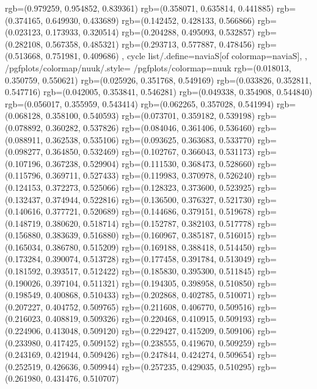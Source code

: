 {{{					rgb=(0.979259, 0.954852, 0.839361)
					rgb=(0.358071, 0.635814, 0.441885)
					rgb=(0.374165, 0.649930, 0.433689)
					rgb=(0.142452, 0.428133, 0.566866)
					rgb=(0.023123, 0.173933, 0.320514)
					rgb=(0.204288, 0.495093, 0.532857)
					rgb=(0.282108, 0.567358, 0.485321)
					rgb=(0.293713, 0.577887, 0.478456)
					rgb=(0.513668, 0.751981, 0.409686)
			},
		cycle list/.define={naviaS}{[of colormap=naviaS]},
		},
		/pgfplots/colormap/nuuk/.style={
			/pgfplots/colormap={nuuk}{%
					rgb=(0.018013, 0.350759, 0.550621)
					rgb=(0.025926, 0.351768, 0.549169)
					rgb=(0.033826, 0.352811, 0.547716)
					rgb=(0.042005, 0.353841, 0.546281)
					rgb=(0.049338, 0.354908, 0.544840)
					rgb=(0.056017, 0.355959, 0.543414)
					rgb=(0.062265, 0.357028, 0.541994)
					rgb=(0.068128, 0.358100, 0.540593)
					rgb=(0.073701, 0.359182, 0.539198)
					rgb=(0.078892, 0.360282, 0.537826)
					rgb=(0.084046, 0.361406, 0.536460)
					rgb=(0.088911, 0.362538, 0.535106)
					rgb=(0.093625, 0.363683, 0.533770)
					rgb=(0.098277, 0.364850, 0.532469)
					rgb=(0.102767, 0.366043, 0.531173)
					rgb=(0.107196, 0.367238, 0.529904)
					rgb=(0.111530, 0.368473, 0.528660)
					rgb=(0.115796, 0.369711, 0.527433)
					rgb=(0.119983, 0.370978, 0.526240)
					rgb=(0.124153, 0.372273, 0.525066)
					rgb=(0.128323, 0.373600, 0.523925)
					rgb=(0.132437, 0.374944, 0.522816)
					rgb=(0.136500, 0.376327, 0.521730)
					rgb=(0.140616, 0.377721, 0.520689)
					rgb=(0.144686, 0.379151, 0.519678)
					rgb=(0.148719, 0.380620, 0.518714)
					rgb=(0.152787, 0.382103, 0.517778)
					rgb=(0.156880, 0.383639, 0.516880)
					rgb=(0.160967, 0.385187, 0.516015)
					rgb=(0.165034, 0.386780, 0.515209)
					rgb=(0.169188, 0.388418, 0.514450)
					rgb=(0.173284, 0.390074, 0.513728)
					rgb=(0.177458, 0.391784, 0.513049)
					rgb=(0.181592, 0.393517, 0.512422)
					rgb=(0.185830, 0.395300, 0.511845)
					rgb=(0.190026, 0.397104, 0.511321)
					rgb=(0.194305, 0.398958, 0.510850)
					rgb=(0.198549, 0.400868, 0.510433)
					rgb=(0.202868, 0.402785, 0.510071)
					rgb=(0.207227, 0.404752, 0.509765)
					rgb=(0.211608, 0.406770, 0.509516)
					rgb=(0.216023, 0.408819, 0.509326)
					rgb=(0.220468, 0.410915, 0.509193)
					rgb=(0.224906, 0.413048, 0.509120)
					rgb=(0.229427, 0.415209, 0.509106)
					rgb=(0.233980, 0.417425, 0.509152)
					rgb=(0.238555, 0.419670, 0.509259)
					rgb=(0.243169, 0.421944, 0.509426)
					rgb=(0.247844, 0.424274, 0.509654)
					rgb=(0.252519, 0.426636, 0.509944)
					rgb=(0.257235, 0.429035, 0.510295)
					rgb=(0.261980, 0.431476, 0.510707)
}}}
